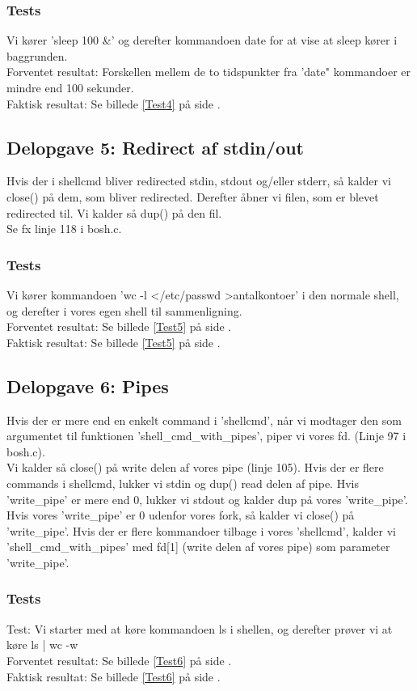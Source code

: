 \subsubsection{Tests}
Vi kører 'sleep 100 \&' og derefter kommandoen date for at vise at sleep kører i baggrunden.
\\Forventet resultat: Forskellen mellem de to tidspunkter fra 'date" kommandoer er mindre end 100 sekunder.
\\Faktisk resultat: Se billede \ref{Test4} på side \pageref{Test4}.

\subsection{Delopgave 5: Redirect af stdin/out}
\label{D5}
Hvis der i shellcmd bliver redirected stdin, stdout og/eller stderr, så kalder vi close() på dem, som bliver redirected. Derefter åbner vi filen, som er blevet redirected til. Vi kalder så dup() på den fil.
\\Se fx linje 118 i bosh.c.
\subsubsection{Tests}
Vi kører kommandoen 'wc -l \textless /etc/passwd \textgreater antalkontoer' i den normale shell, og derefter i vores egen shell til sammenligning.
\\Forventet resultat: Se billede \ref{Test5} på side \pageref{Test5}.
\\Faktisk resultat: Se billede \ref{Test5} på side \pageref{Test5}.
 
\subsection{Delopgave 6: Pipes}
\label{D6}
Hvis der er mere end en enkelt command i 'shellcmd', når vi modtager den som argumentet til funktionen 'shell\_cmd\_with\_pipes', piper vi vores fd. (Linje 97 i bosh.c).
\\Vi kalder så close() på write delen af vores pipe (linje 105). Hvis der er flere commands i shellcmd, lukker vi stdin og dup() read delen af pipe. Hvis 'write\_pipe' er mere end 0, lukker vi stdout og kalder dup på vores 'write\_pipe'.
\\Hvis vores 'write\_pipe' er 0 udenfor vores fork, så kalder vi close() på 'write\_pipe'. Hvis der er flere kommandoer tilbage i vores 'shellcmd', kalder vi 'shell\_cmd\_with\_pipes' med fd[1] (write delen af vores pipe) som parameter 'write\_pipe'.
\subsubsection{Tests}
Test: Vi starter med at køre kommandoen ls i shellen, og derefter prøver vi at køre ls | wc -w
\\Forventet resultat: Se billede \ref{Test6} på side \pageref{Test6}.
\\Faktisk resultat: Se billede \ref{Test6} på side \pageref{Test6}.

